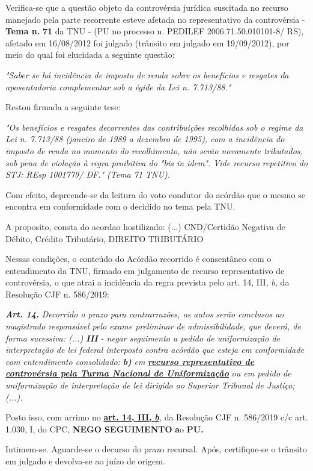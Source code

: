\documentclass[12pt]{article}
\begin{document}
\justifying
\noindent Verifica-se que a questão objeto da controvérsia jurídica suscitada no recurso manejado pela parte recorrente esteve afetada no representativo da controvérsia - \textbf{Tema n. }\textbf{71} da TNU - (PU no processo n. PEDILEF 2006.71.50.010101-8/ RS),  afetado em 16/08/2012 foi julgado (trânsito em julgado em 19/09/2012), por meio do qual foi elucidada a seguinte questão:

\noindent \textit{"Saber se há incidência de imposto de renda sobre os benefícios e resgates da aposentadoria complementar sob a égide da Lei n. 7.713/88."}

\noindent Restou firmada a seguinte tese:

\noindent \textit{"Os benefícios e resgates decorrentes das contribuições recolhidas sob o regime da Lei n. 7.713/88 (janeiro de 1989 a dezembro de 1995), com a incidência do imposto de renda no momento do recolhimento, não serão novamente tributados, sob pena de violação à regra proibitiva do "bis in idem". Vide recurso repetitivo do STJ: REsp 1001779/ DF." (Tema 71 TNU).}

\noindent Com efeito, depreende-se da leitura do voto condutor do acórdão que o mesmo se encontra em conformidade com o decidido no  tema pela TNU.

\noindent A proposito, consta do acordao hostilizado: (...) CND/Certidão Negativa de Débito, Crédito Tributário, DIREITO TRIBUTÁRIO

\noindent Nessas condições, o conteúdo do Acórdão recorrido é consentâneo com o entendimento da TNU, firmado em julgamento de recurso representativo de controvérsia, o que atrai a incidência da regra prevista pelo art. 14, III, \textit{b,} da Resolução CJF n. 586/2019:

\noindent \textit{\textbf{Art. 14.}}\textit{ Decorrido o prazo para contrarrazões, os autos serão conclusos ao magistrado responsável pelo exame preliminar de admissibilidade, que deverá, de forma sucessiva: (...) }\textit{\textbf{III }}\textit{- negar seguimento a pedido de uniformização de interpretação de lei federal interposto contra acórdão que esteja em conformidade com entendimento consolidado: }\textit{\textbf{b)}}\textit{ em }\uline{\textit{\textbf{recurso representativo de controvérsia pela Turma Nacional de Uniformização}}}\textit{ ou em pedido de uniformização de interpretação de lei dirigido ao Superior Tribunal de Justiça;(...).}

\noindent Posto isso, com arrimo no \uline{\textbf{art. 14, III, }}\uline{\textit{\textbf{b}}}\textit{,} da Resolução CJF n. 586/2019 c/c art. 1.030, I, do CPC, \textbf{NEGO SEGUIMENTO }\textbf{a}o\textbf{ PU}\textbf{.}

\noindent Intimem-se. Aguarde-se o decurso do prazo recursal. Após, certifique-se o trânsito em julgado e devolva-se ao juízo de origem.
\end{document}
